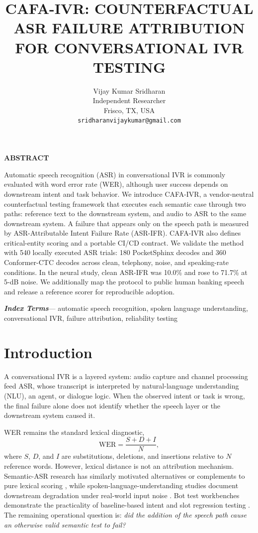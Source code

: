 \documentclass[9pt,twocolumn]{extarticle}
\title{\vspace*{2mm}\textbf{CAFA-IVR: COUNTERFACTUAL ASR FAILURE ATTRIBUTION\\FOR CONVERSATIONAL IVR TESTING}}
\author{Vijay Kumar Sridharan\\Independent Researcher\\Frisco, TX, USA\\\texttt{sridharanvijaykumar@gmail.com}}
\date{}
\renewenvironment{abstract}{\begin{center}\bfseries ABSTRACT\end{center}\noindent}{\par}
\newenvironment{keywords}{\vspace{0.5em}\noindent\textbf{\textit{Index Terms}}---}{\par}
\begin{document}
\maketitle
\thispagestyle{empty}

\begin{abstract}
Automatic speech recognition (ASR) in conversational IVR is commonly evaluated with word error rate (WER), although user success depends on downstream intent and task behavior. We introduce CAFA-IVR, a vendor-neutral counterfactual testing framework that executes each semantic case through two paths: reference text to the downstream system, and audio to ASR to the same downstream system. A failure that appears only on the speech path is measured by ASR-Attributable Intent Failure Rate (ASR-IFR). CAFA-IVR also defines critical-entity scoring and a portable CI/CD contract. We validate the method with 540 locally executed ASR trials: 180 PocketSphinx decodes and 360 Conformer-CTC decodes across clean, telephony, noise, and speaking-rate conditions. In the neural study, clean ASR-IFR was 10.0\% and rose to 71.7\% at 5-dB noise. We additionally map the protocol to public human banking speech and release a reference scorer for reproducible adoption.
\end{abstract}

\begin{keywords}
automatic speech recognition, spoken language understanding, conversational IVR, failure attribution, reliability testing
\end{keywords}

\section{Introduction}
A conversational IVR is a layered system: audio capture and channel processing feed ASR, whose transcript is interpreted by natural-language understanding (NLU), an agent, or dialogue logic. When the observed intent or task is wrong, the final failure alone does not identify whether the speech layer or the downstream system caused it.

WER remains the standard lexical diagnostic,
\begin{equation}
\mathrm{WER}=\frac{S+D+I}{N},
\end{equation}
where $S$, $D$, and $I$ are substitutions, deletions, and insertions relative to $N$ reference words. However, lexical distance is not an attribution mechanism. Semantic-ASR research has similarly motivated alternatives or complements to pure lexical scoring \cite{kim2021,roy2021}, while spoken-language-understanding studies document downstream degradation under real-world input noise \cite{sengupta2021}. Bot test workbenches demonstrate the practicality of baseline-based intent and slot regression testing \cite{awslex}. The remaining operational question is: \emph{did the addition of the speech path cause an otherwise valid semantic test to fail?}
\end{document}
